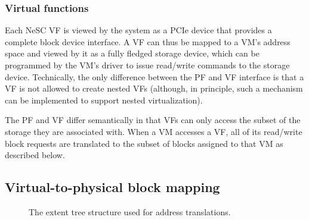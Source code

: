 \subsubsection*{Virtual functions}
Each NeSC VF is viewed by the system as a PCIe device that provides a complete block device interface. A VF can thus be mapped to a VM's address space and viewed by it as a fully fledged storage device, which can be programmed by the VM's driver to issue read/write commands to the storage device. Technically, the only difference between the PF and VF interface is that a VF is not allowed to create nested VFs (although, in principle, such a mechanism can be implemented to support nested virtualization).

The PF and VF differ semantically in that VFs can only access the subset of the storage they are associated with. When a VM accesses a VF, all of its read/write block requests are translated to the subset of blocks assigned to that VM as described below.

\subsection{Virtual-to-physical block mapping}

\begin{figure}[t]
  \centering

      \caption{The extent tree structure used for address translations.\label{fig:extent}}

\end{figure}

